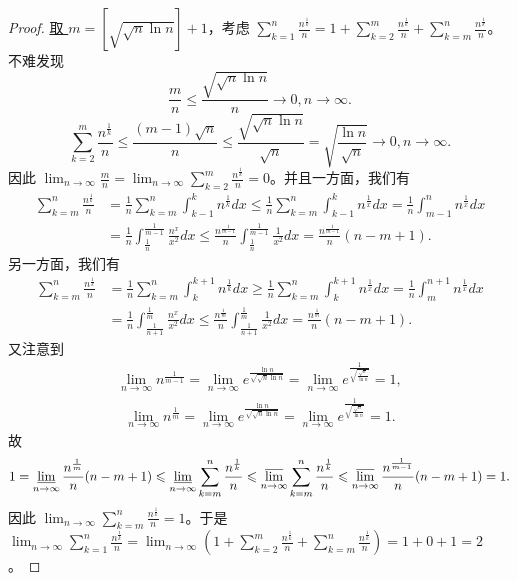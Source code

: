 \documentclass[lang=cn,newtx,10pt,scheme=chinese]{elegantbook}
\begin{document}
\begin{proof}
\hyperlink{取m的原因}{取 \(m = [\sqrt{\sqrt{n}\ln n}]+1\)}，考虑 \(\sum_{k = 1}^n\frac{n^{\frac{1}{k}}}{n}=1+\sum_{k = 2}^m\frac{n^{\frac{1}{k}}}{n}+\sum_{k = m}^n\frac{n^{\frac{1}{k}}}{n}\)。不难发现
\[
\frac{m}{n}\leqslant \frac{\sqrt{\sqrt{n}\ln n}}{n}\rightarrow 0,n\rightarrow \infty.
\]
\[
\sum_{k = 2}^m\frac{n^{\frac{1}{k}}}{n}\leqslant \frac{(m - 1)\sqrt{n}}{n}\leqslant \frac{\sqrt{\sqrt{n}\ln n}}{\sqrt{n}}=\sqrt{\frac{\ln n}{\sqrt{n}}}\rightarrow 0,n\rightarrow \infty.
\]
因此 \(\lim_{n\rightarrow \infty}\frac{m}{n}=\lim_{n\rightarrow \infty}\sum_{k = 2}^m\frac{n^{\frac{1}{k}}}{n}=0\)。并且一方面，我们有
\begin{align*}
\sum_{k=m}^n{\frac{n^{\frac{1}{k}}}{n}}&=\frac{1}{n}\sum_{k=m}^n{\int_{k-1}^k{n^{\frac{1}{k}}dx}}\leqslant \frac{1}{n}\sum_{k=m}^n{\int_{k-1}^k{n^{\frac{1}{x}}dx}}=\frac{1}{n}\int_{m-1}^n{n^{\frac{1}{x}}dx}
\\
&=\frac{1}{n}\int_{\frac{1}{n}}^{\frac{1}{m-1}}{\frac{n^x}{x^2}dx}\leqslant \frac{n^{\frac{1}{m-1}}}{n}\int_{\frac{1}{n}}^{\frac{1}{m-1}}{\frac{1}{x^2}dx}=\frac{n^{\frac{1}{m-1}}}{n}\left( n-m+1 \right) .
\end{align*}
另一方面，我们有
\begin{align*}
\sum_{k=m}^n{\frac{n^{\frac{1}{k}}}{n}}&=\frac{1}{n}\sum_{k=m}^n{\int_k^{k+1}{n^{\frac{1}{k}}dx}}\geqslant \frac{1}{n}\sum_{k=m}^n{\int_k^{k+1}{n^{\frac{1}{x}}dx}}=\frac{1}{n}\int_m^{n+1}{n^{\frac{1}{x}}dx}
\\
&=\frac{1}{n}\int_{\frac{1}{n+1}}^{\frac{1}{m}}{\frac{n^x}{x^2}dx}\leqslant \frac{n^{\frac{1}{m}}}{n}\int_{\frac{1}{n+1}}^{\frac{1}{m}}{\frac{1}{x^2}dx}=\frac{n^{\frac{1}{m}}}{n}\left( n-m+1 \right) .
\end{align*}
又注意到
\begin{align*}
\lim_{n\rightarrow \infty}n^{\frac{1}{m - 1}}=\lim_{n\rightarrow \infty}e^{\frac{\ln n}{\sqrt{\sqrt{n}\ln n}}}
=\lim_{n\rightarrow \infty}e^{\frac{1}{\sqrt{\frac{\sqrt{n}}{\ln n}}}}
=1,
\end{align*}
\begin{align*}
\lim_{n\rightarrow \infty}n^{\frac{1}{m}}=\lim_{n\rightarrow \infty}e^{\frac{\ln n}{\sqrt{\sqrt{n}\ln n}}}
=\lim_{n\rightarrow \infty}e^{\frac{1}{\sqrt{\frac{\sqrt{n}}{\ln n}}}}
=1.
\end{align*}
故
\[
1=\varliminf_{n\rightarrow \infty}\frac{n^{\frac{1}{m}}}{n}(n - m + 1)\leqslant \varliminf_{n\rightarrow \infty}\sum_{k = m}^n\frac{n^{\frac{1}{k}}}{n}\leqslant \varlimsup_{n\rightarrow \infty}\sum_{k = m}^n\frac{n^{\frac{1}{k}}}{n}\leqslant \varlimsup_{n\rightarrow \infty}\frac{n^{\frac{1}{m - 1}}}{n}(n - m + 1)=1.
\]
因此 \(\lim_{n\rightarrow \infty}\sum_{k = m}^n\frac{n^{\frac{1}{k}}}{n}=1\)。于是 \(\lim_{n\rightarrow \infty}\sum_{k = 1}^n\frac{n^{\frac{1}{k}}}{n}=\lim_{n\rightarrow \infty}\left(1+\sum_{k = 2}^m\frac{n^{\frac{1}{k}}}{n}+\sum_{k = m}^n\frac{n^{\frac{1}{k}}}{n}\right)=1 + 0+1 = 2\)。
\end{proof}
\end{document}
